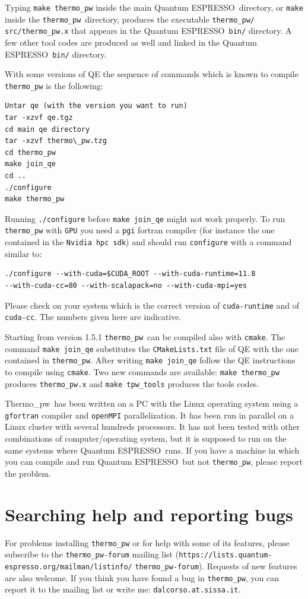 \documentclass[12pt,a4paper,twoside]{report}
\def\qe{{\sc Quantum ESPRESSO}}
\def\thermo{{\sc Thermo}\_{\sc pw}}
\begin{document}
Typing \texttt{make thermo\_pw} inside the main \qe\ directory, 
or \texttt{make} 
inside the \texttt{thermo\_pw}\ directory, produces the executable
\texttt{thermo\_pw/} \texttt{src/thermo\_pw.x} that appears in the 
\qe\ \texttt{bin/} directory. A few other tool codes are produced as well
and linked in the \qe\ \texttt{bin/} directory.

With some versions of QE the sequence of commands which is
known to compile \texttt{thermo\_pw} is the following:
\begin{verbatim}
Untar qe (with the version you want to run)
tar -xzvf qe.tgz
cd main qe directory
tar -xzvf thermo\_pw.tzg
cd thermo_pw
make join_qe
cd ..
./configure
make thermo_pw
\end{verbatim}
Running \texttt{./configure} before \texttt{make join\_qe} might not 
work properly. To run \texttt{thermo\_pw} with \texttt{GPU} you need
a \texttt{pgi} fortran compiler (for instance the one contained in the 
\texttt{Nvidia hpc sdk}) and should run \texttt{configure} with
a command similar to:
\begin{verbatim}
./configure --with-cuda=$CUDA_ROOT --with-cuda-runtime=11.8 
--with-cuda-cc=80 --with-scalapack=no --with-cuda-mpi=yes
\end{verbatim}
Please check on your system which is the correct version of 
\texttt{cuda-runtime} and of \texttt{cuda-cc}. The numbers given here
are indicative.

Starting from version 1.5.1 \texttt{thermo\_pw}\ can be compiled also
with \texttt{cmake}. The command \texttt{make join\_qe} substitutes
the \texttt{CMakeLists.txt} file of QE with the one contained
in \texttt{thermo\_pw}. After writing \texttt{make join\_qe} follow the 
QE instructions to compile using \texttt{cmake}. Two new commands are
available: \texttt{make thermo\_pw} produces \texttt{thermo\_pw.x}  
and \texttt{make tpw\_tools} produces the tools codes.


\thermo\ has been written on a PC with the Linux operating system using a
\texttt{gfortran} compiler and \texttt{openMPI} parallelization. It has
been run in parallel on a Linux cluster with several hundreds processors.
It has not been tested with other combinations of computer/operating system, 
but it is supposed to run on the same systems where \qe\ runs. If
you have a machine in which you can compile and run \qe\ but not 
\texttt{thermo\_pw}, please report the problem.

\newpage
{\color{coral}\section{Searching help and reporting bugs}}
\color{black}
For problems installing \texttt{thermo\_pw} or for help
with some of its features, please subscribe to the \texttt{thermo\_pw-forum}
mailing list 
(\texttt{https://lists.quantum-} \texttt{espresso.org/mailman/listinfo/}
\texttt{thermo\_pw-forum}). 
Requests of new features are also welcome. If you think you have
found a bug 
in \texttt{thermo\_pw}, you can report it to the mailing list or 
write me: \texttt{dalcorso.at.sissa.it}.
\end{document}
